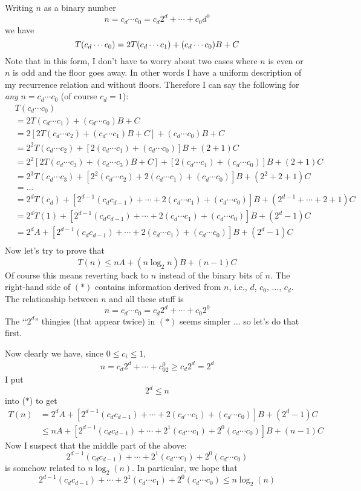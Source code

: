 Writing $n$ as a binary number
\[
n = c_d\cdots c_0 = c_d2^d + \cdots + c_0d^0
\]
we have
\[
T(c_d \cdots c_0) 
= 2T(c_d \cdots c_1) + (c_d \cdots c_0)B + C \\
\]
Note that in this form, I don't have to worry about two cases where
$n$ is even or $n$ is odd and the floor goes away.
In other words I have a uniform description of my recurrence relation
and without floors.
Therefore I can say the following for \textit{any} $n = c_d \cdots c_0$
(of course $c_d = 1$):
\begin{align*}
&T(c_d \cdots c_0) \\
&= 2T(c_d \cdots c_1) + (c_d \cdots c_0)B + C \\
&= 2[2T(c_d \cdots c_2) + (c_d \cdots c_1)B + C] + (c_d \cdots c_0)B + C \\
&= 2^2T(c_d \cdots c_2) + [2(c_d \cdots c_1) + (c_d \cdots c_0)]B + (2+1)C \\
&= 2^2[2T(c_d \cdots c_3) + (c_d \cdots c_3)B + C] + [2(c_d \cdots c_1) + (c_d \cdots c_0)]B + (2+1)C \\
&= 2^3T(c_d \cdots c_3) 
   + [2^2 (c_d \cdots c_2) + 2(c_d \cdots c_1) + (c_d \cdots c_0)]B 
   + (2^2 + 2 + 1)C \\
&=... \\
&= 2^dT(c_d) 
   + [2^{d-1}(c_d c_{d-1}) + \cdots + 2(c_d \cdots c_1) + (c_d \cdots c_0)]B 
   + (2^{d-1} + \cdots + 2 + 1)C \\
&= 2^dT(1) 
   + [2^{d-1}(c_d c_{d-1}) + \cdots + 2(c_d \cdots c_1) + (c_d \cdots c_0)]B 
   + (2^d - 1)C 
\\
&= 2^dA
   + [2^{d-1}(c_d c_{d-1}) + \cdots + 2(c_d \cdots c_1) + (c_d \cdots c_0)]B 
   + (2^d - 1)C 
\tag{$*$}\\
\end{align*}
Now let's try to prove that 
\[
T(n) \leq nA + (n \log_2 n)B + (n - 1)C
\]
Of course this means reverting back to $n$ instead of the 
binary bits of $n$.
The right-hand side of $(*)$ contains information derived from $n$,
i.e., $d$, $c_0$, ..., $c_d$.
The relationship between $n$ and all these stuff is
\[
n = c_d \cdots c_0 = c_d 2^d + \cdots + c_0 2^0
\]
The \lq\lq $2^d$'' thingies (that appear twice) in $(*)$ seems simpler ... so let's do that first.

Now clearly we have, since $0 \leq c_i \leq 1$,
\begin{align*}
n = c_d2^d + \cdots + c_02^0 
\geq c_d2^d = 2^d
\end{align*}
I put
\[
2^d \leq n
\]
into ($*$) to get
\begin{align*}
T(n) 
&= 2^dA
   + [2^{d-1}(c_d c_{d-1}) + \cdots + 2(c_d \cdots c_1) + (c_d \cdots c_0)]B 
   + (2^d - 1)C
\\
&\leq nA 
   + [2^{d-1}(c_d c_{d-1}) + \cdots 
   + 2^1(c_d \cdots c_1) + 2^0(c_d \cdots c_0)]B 
   + (n - 1)C 
\end{align*}
Now I suspect that the middle part of the above:
\[
2^{d-1}(c_d c_{d-1}) + \cdots + 2^1(c_d \cdots c_1) + 2^0(c_d \cdots c_0) 
\]
is somehow related to $n \log_2(n)$.
In particular, we hope that
\[
2^{d-1}(c_d c_{d-1}) + \cdots + 2^1(c_d \cdots c_1) + 2^0(c_d \cdots c_0) 
\leq n \log_2 (n)
\]

